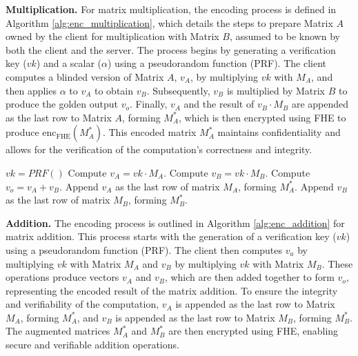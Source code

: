 \noindent\textbf{Multiplication.}
For matrix multiplication, the encoding process is defined in Algorithm \ref{alg:enc_multiplication}, which details the steps to prepare Matrix \( A \) owned by the client for multiplication with Matrix \( B \), assumed to be known by both the client and the server. The process begins by generating a verification key (\( vk \)) and a scalar (\( \alpha \)) using a pseudorandom function (PRF). The client computes a blinded version of Matrix \( A \), \( v_A \), by multiplying \( vk \) with \( M_A \), and then applies \( \alpha \) to \( v_A \) to obtain \( v_B \). Subsequently, \( v_B \) is multiplied by Matrix \( B \) to produce the golden output \( v_o \). Finally, \( v_A \) and the result of \( v_B \cdot M_B \) are appended as the last row to Matrix \( A \), forming \( M^*_A \), which is then encrypted using FHE to produce \( \text{enc}_{\text{FHE}}(M^*_A) \). This encoded matrix \( M^*_A \) maintains confidentiality and allows for the verification of the computation's correctness and integrity.

\begin{algorithm}
\caption{\texttt{DataSeal.encode(f(+), M\_A, M\_B)}}
\label{alg:enc_addition}
\begin{algorithmic}[1]
\STATE $vk = PRF()$
\STATE Compute $v_A = vk \cdotp M_A$.
\STATE Compute $v_B = vk \cdotp M_B$.
\STATE Compute $v_o = v_A + v_B$.
\STATE Append $v_A$ as the last row of matrix $M_A$, forming $M^*_A$.
\STATE Append $v_B$ as the last row of matrix $M_B$, forming $M^*_B$.
\end{algorithmic}
\end{algorithm}

\noindent\textbf{Addition.}
The encoding process is outlined in Algorithm \ref{alg:enc_addition} for matrix addition. This process starts with the generation of a verification key (\( vk \)) using a pseudorandom function (PRF). The client then computes \( v_a \) by multiplying \( vk \) with Matrix \( M_A \) and \( v_B \) by multiplying \( vk \) with Matrix \( M_B \). These operations produce vectors \( v_A \) and \( v_B \), which are then added together to form \( v_o \), representing the encoded result of the matrix addition. To ensure the integrity and verifiability of the computation, \( v_A \) is appended as the last row to Matrix \( M_A \), forming \( M^*_A \), and \( v_B \) is appended as the last row to Matrix \( M_B \), forming \( M^*_B \). The augmented matrices \( M^*_A \) and \( M^*_B \) are then encrypted using FHE, enabling secure and verifiable addition operations.

